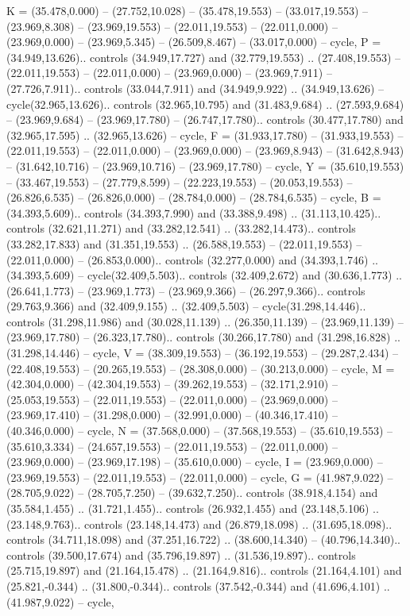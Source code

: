 {K} = {(35.478,0.000) -- (27.752,10.028) -- (35.478,19.553) -- (33.017,19.553) -- (23.969,8.308) -- (23.969,19.553) -- (22.011,19.553) -- (22.011,0.000) -- (23.969,0.000) -- (23.969,5.345) -- (26.509,8.467) -- (33.017,0.000) -- cycle},
{P} = {(34.949,13.626).. controls (34.949,17.727) and (32.779,19.553) .. (27.408,19.553) -- (22.011,19.553) -- (22.011,0.000) -- (23.969,0.000) -- (23.969,7.911) -- (27.726,7.911).. controls (33.044,7.911) and (34.949,9.922) .. (34.949,13.626) -- cycle(32.965,13.626).. controls (32.965,10.795) and (31.483,9.684) .. (27.593,9.684) -- (23.969,9.684) -- (23.969,17.780) -- (26.747,17.780).. controls (30.477,17.780) and (32.965,17.595) .. (32.965,13.626) -- cycle},
{F} = {(31.933,17.780) -- (31.933,19.553) -- (22.011,19.553) -- (22.011,0.000) -- (23.969,0.000) -- (23.969,8.943) -- (31.642,8.943) -- (31.642,10.716) -- (23.969,10.716) -- (23.969,17.780) -- cycle},
{Y} = {(35.610,19.553) -- (33.467,19.553) -- (27.779,8.599) -- (22.223,19.553) -- (20.053,19.553) -- (26.826,6.535) -- (26.826,0.000) -- (28.784,0.000) -- (28.784,6.535) -- cycle},
{B} = {(34.393,5.609).. controls (34.393,7.990) and (33.388,9.498) .. (31.113,10.425).. controls (32.621,11.271) and (33.282,12.541) .. (33.282,14.473).. controls (33.282,17.833) and (31.351,19.553) .. (26.588,19.553) -- (22.011,19.553) -- (22.011,0.000) -- (26.853,0.000).. controls (32.277,0.000) and (34.393,1.746) .. (34.393,5.609) -- cycle(32.409,5.503).. controls (32.409,2.672) and (30.636,1.773) .. (26.641,1.773) -- (23.969,1.773) -- (23.969,9.366) -- (26.297,9.366).. controls (29.763,9.366) and (32.409,9.155) .. (32.409,5.503) -- cycle(31.298,14.446).. controls (31.298,11.986) and (30.028,11.139) .. (26.350,11.139) -- (23.969,11.139) -- (23.969,17.780) -- (26.323,17.780).. controls (30.266,17.780) and (31.298,16.828) .. (31.298,14.446) -- cycle},
{V} = {(38.309,19.553) -- (36.192,19.553) -- (29.287,2.434) -- (22.408,19.553) -- (20.265,19.553) -- (28.308,0.000) -- (30.213,0.000) -- cycle},
{M} = {(42.304,0.000) -- (42.304,19.553) -- (39.262,19.553) -- (32.171,2.910) -- (25.053,19.553) -- (22.011,19.553) -- (22.011,0.000) -- (23.969,0.000) -- (23.969,17.410) -- (31.298,0.000) -- (32.991,0.000) -- (40.346,17.410) -- (40.346,0.000) -- cycle},
{N} = {(37.568,0.000) -- (37.568,19.553) -- (35.610,19.553) -- (35.610,3.334) -- (24.657,19.553) -- (22.011,19.553) -- (22.011,0.000) -- (23.969,0.000) -- (23.969,17.198) -- (35.610,0.000) -- cycle},
{I} = {(23.969,0.000) -- (23.969,19.553) -- (22.011,19.553) -- (22.011,0.000) -- cycle},
{G} = {(41.987,9.022) -- (28.705,9.022) -- (28.705,7.250) -- (39.632,7.250).. controls (38.918,4.154) and (35.584,1.455) .. (31.721,1.455).. controls (26.932,1.455) and (23.148,5.106) .. (23.148,9.763).. controls (23.148,14.473) and (26.879,18.098) .. (31.695,18.098).. controls (34.711,18.098) and (37.251,16.722) .. (38.600,14.340) -- (40.796,14.340).. controls (39.500,17.674) and (35.796,19.897) .. (31.536,19.897).. controls (25.715,19.897) and (21.164,15.478) .. (21.164,9.816).. controls (21.164,4.101) and (25.821,-0.344) .. (31.800,-0.344).. controls (37.542,-0.344) and (41.696,4.101) .. (41.987,9.022) -- cycle},
